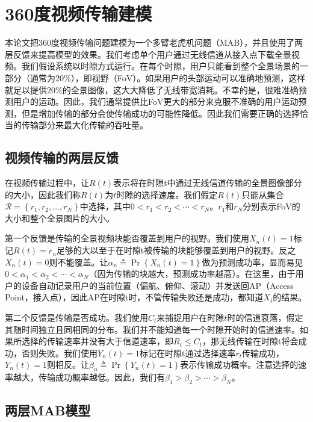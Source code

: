 \chapter{360度视频传输建模}
本论文把360度视频传输问题建模为一个多臂老虎机问题（MAB），并且使用了两层反馈来提高模型的效果。我们考虑单个用户通过无线信道从接入点下载全景视频。我们假设系统以时隙方式运行。在每个时隙，用户只能看到整个全景场景的一部分（通常为20\%），即视野（FoV）。如果用户的头部运动可以准确地预测，这样就足以提供20\%的全景图像，这大大降低了无线带宽消耗。不幸的是，很难准确预测用户的运动。因此，我们通常提供比FoV更大的部分来克服不准确的用户运动预测，但是增加传输的部分会使传输成功的可能性降低。因此我们需要正确的选择恰当的传输部分来最大化传输的吞吐量。


\section{视频传输的两层反馈}
在视频传输过程中，让$R(t)$表示将在时隙t中通过无线信道传输的全景图像部分的大小，因此我们称$R(t)$为$t$时隙的选择速度。我们假定$R(t)$只能从集合$\mathcal{R}=\left\{r_{1}, r_{2}, \ldots, r_{N}\right\}$中选择，其中$0<r_{1}<r_{2}<\cdots<r_{N}$。$r_{1}$和$r_{N}$分别表示FoV的大小和整个全景图片的大小。


第一个反馈是传输的全景视频块能否覆盖到用户的视野。我们使用$X_{n}(t)=1$标记$R(t) = r_{n}$足够的大以至于在时隙t被传输的块能够覆盖到用户的视野。反之$X_{n}(t)=0$则不能覆盖。让$\alpha_{n} \triangleq \operatorname{Pr}\left\{X_{n}(t)=1\right\}$做为预测成功率，显而易见$0<\alpha_{1}<\alpha_{2}<\cdots<\alpha_{N}$（因为传输的块越大，预测成功率越高）。在这里，由于用户的设备自动记录用户的当前位置（偏航、俯仰、滚动）并发送回AP（Access Point，接入点），因此AP在时隙t时，不管传输失败还是成功，都知道$X_{t}$的结果。


第二个反馈是传输是否成功。我们使用$C_{t}$来捕捉用户在时隙$t$时的信道衰落，假定其随时间独立且同相同的分布。我们并不能知道每一个时隙开始时的信道速率。如果所选择的传输速率并没有大于信道速率，即$R_{t} \leq C_{t}$，那无线传输在时隙t将会成功，否则失败。我们使用$Y_{n}(t) = 1$标记在时隙t通过选择速率$r_{t}$传输成功，$Y_{n}(t) = 1$则相反。让$\beta_{n} \triangleq \operatorname{Pr}\left\{Y_{n}(t)=1\right\}$表示传输成功概率。注意选择的速率越大，传输成功概率越低。因此，我们有$\beta_{1}>\beta_{2}>\cdots>\beta_{N}$。


\section{两层MAB模型}

